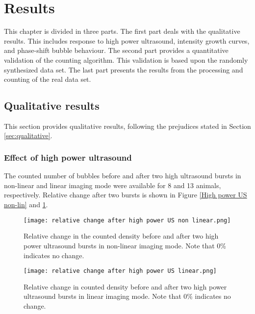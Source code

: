 \FloatBarrier
\section{Results}
This chapter is divided in three parts. The first part deals with the qualitative results. This includes response to high power ultrasound, intensity growth curves, and phase-shift bubble behaviour. The second part provides a quantitative validation of the counting algorithm. This validation is based upon the randomly synthesized data set. The last part presents the results from the processing and counting of the real data set. 
 
\subsection{Qualitative results}
This section provides qualitative results, following the prejudices stated in Section \ref{sec:qualitative}.
\subsubsection{Effect of high power ultrasound}

The counted number of bubbles before and after two high ultrasound bursts in non-linear and linear imaging mode were available for 8 and 13 animals, respectively. Relative change after two bursts is shown in Figure \ref{High power US non-lin} and \ref{High power US lin}.
\begin{figure}
\centering
\begin{minipage}[t]{.5\textwidth}
\centering
\texttt{[image: relative change after high power US non linear.png]}
\caption{Relative change in the counted density before and after two high power ultrasound bursts in non-linear imaging mode. Note that 0\% indicates no change.}
\label{High power US non-lin}
\end{minipage}\hfill
\begin{minipage}[t]{.5\textwidth}
\centering
\texttt{[image: relative change after high power US linear.png]}
\caption{Relative change in counted density before and after two high power ultrasound bursts in linear imaging mode. Note that 0\% indicates no change.}
\label{High power US lin}
\end{minipage}
\end{figure}


